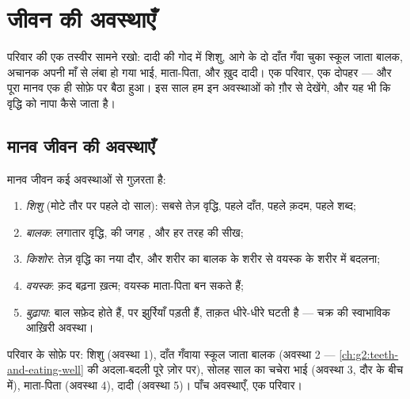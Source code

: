 \chapter{जीवन की अवस्थाएँ}\label{ch:g3:stages-of-life}

परिवार की एक तस्वीर सामने रखो: दादी की गोद में शिशु, आगे के दो दाँत
गँवा चुका स्कूल जाता बालक, अचानक अपनी माँ से लंबा हो गया  भाई,
माता-पिता, और ख़ुद दादी। एक परिवार, एक दोपहर --- और पूरा मानव 
एक ही सोफ़े पर बैठा हुआ। इस साल हम इन अवस्थाओं को ग़ौर से देखेंगे, और
यह भी कि वृद्धि को नापा कैसे जाता है।

\section{मानव जीवन की अवस्थाएँ}

\begin{definition}[मानव जीवन की अवस्थाएँ]\label{def:g3:stages-of-life:stages}
मानव जीवन कई अवस्थाओं से गुज़रता है:
\begin{enumerate}
  \item \emph{शिशु} (मोटे तौर पर पहले दो साल): सबसे तेज़
        वृद्धि, पहले दाँत, पहले क़दम, पहले शब्द;
  \item \emph{बालक}: लगातार वृद्धि,  की जगह
        , और हर तरह की सीख;
  \item \emph{किशोर}: तेज़ वृद्धि का नया दौर, और शरीर का
        बालक के शरीर से वयस्क के शरीर में बदलना;
  \item \emph{वयस्क}: क़द बढ़ना ख़त्म; वयस्क माता-पिता
        बन सकते हैं;
  \item \emph{बुढ़ापा}: बाल सफ़ेद होते हैं,  पर
        झुर्रियाँ पड़ती हैं, ताक़त धीरे-धीरे घटती है --- चक्र की
        स्वाभाविक आख़िरी अवस्था।
\end{enumerate}
\end{definition}

\begin{example}[सोफ़े को पढ़ना]\label{ex:g3:stages-of-life:sofa}
परिवार के सोफ़े पर: शिशु (अवस्था 1), दाँत गँवाया स्कूल जाता बालक
(अवस्था 2 --- \cref{ch:g2:teeth-and-eating-well} की अदला-बदली पूरे
ज़ोर पर), सोलह साल का चचेरा भाई (अवस्था 3, दौर के बीच में), माता-पिता
(अवस्था 4), दादी (अवस्था 5)। पाँच अवस्थाएँ, एक परिवार।
\end{example}

